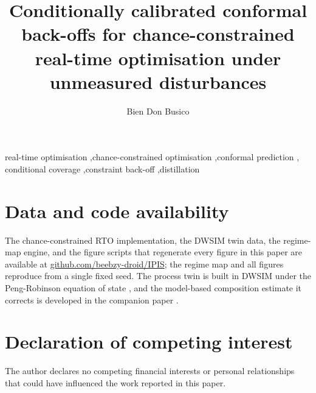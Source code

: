 \documentclass[review,12pt]{elsarticle}
\begin{document}
\begin{frontmatter}

\title{Conditionally calibrated conformal back-offs for chance-constrained real-time
optimisation under unmeasured disturbances}

\author{Bien Don Busico}
\address{Map\'ua Malayan Colleges Mindanao, Davao City, Philippines}

\begin{abstract}

\end{abstract}

\begin{keyword}
real-time optimisation \sep chance-constrained optimisation \sep conformal prediction \sep
conditional coverage \sep constraint back-off \sep distillation
\end{keyword}

\end{frontmatter}
\linenumbers









\section*{Data and code availability}
The chance-constrained RTO implementation, the DWSIM twin data, the regime-map engine, and
the figure scripts that regenerate every figure in this paper are available at
\url{github.com/beebzy-droid/IPIS}; the regime map and all figures reproduce from a single
fixed seed. The process twin is built in DWSIM \citep{dwsim} under the Peng-Robinson
equation of state \citep{peng1976}, and the model-based composition estimate it corrects is
developed in the companion paper \citep{companion2026}.

\section*{Declaration of competing interest}
The author declares no competing financial interests or personal relationships that
could have influenced the work reported in this paper.



\end{document}

